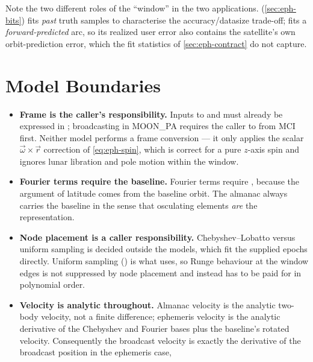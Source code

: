 Note the two different roles of the ``window'' in the two applications.
 (\cref{sec:eph-bits}) fits \emph{past} truth samples to
characterise the accuracy/datasize trade-off;  fits a
\emph{forward-predicted} arc, so its realized user error also contains the
satellite's own orbit-prediction error, which the fit statistics of
\cref{sec:eph-contract} do not capture.

\section{Model Boundaries}
\label{sec:eph-boundaries}

\begin{itemize}[leftmargin=1.4em]
  \item \textbf{Frame is the caller's responsibility.} Inputs to  and
     must already be expressed in ;
    broadcasting in MOON\_PA requires the caller to  from MCI
    first. Neither model performs a frame conversion --- it only applies the
    scalar $\vec{\omega}\times\vec{r}$ correction of \cref{eq:eph-spin}, which
    is correct for a pure $z$-axis spin and ignores lunar libration and pole
    motion within the window.
  \item \textbf{Fourier terms require the baseline.} 
    Fourier terms require , because the argument
    of latitude comes from the baseline orbit. The almanac always carries the
    baseline in the sense that osculating elements \emph{are} the
    representation.
  \item \textbf{Node placement is a caller responsibility.} Chebyshev--Lobatto
    versus uniform sampling is decided outside the models, which fit the
    supplied epochs directly. Uniform sampling
    () is what
     uses, so Runge behaviour at the window edges is not
    suppressed by node placement and instead has to be paid for in polynomial
    order.
  \item \textbf{Velocity is analytic throughout.} Almanac velocity is the
    analytic two-body velocity, not a finite difference; ephemeris velocity is
    the analytic derivative of the Chebyshev and Fourier bases plus the
    baseline's rotated velocity. Consequently the broadcast velocity is
    exactly the derivative of the broadcast position in the ephemeris case,

\end{itemize}
